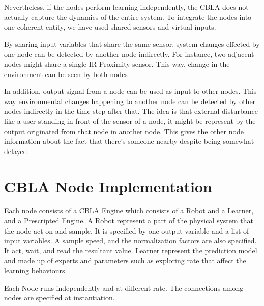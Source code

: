 Nevertheless, if the nodes perform learning independently, the CBLA does not actually capture the dynamics of the entire system. To integrate the nodes into one coherent entity, we have used shared sensors and virtual inputs.

By sharing input variables that share the same sensor, system changes effected by one node can be detected by another node indirectly. For instance, two adjacent nodes might share a single IR Proximity sensor. This way, change in the environment can be seen by both nodes

In addition, output signal from a node can be used as input to other nodes. This way environmental changes happening to another node can be detected by other nodes indirectly in the time step after that. The idea is that external disturbance like a user standing in front of the sensor of a node, it might be represent by the output originated from  that node in another node. This gives the other node information about the fact that there's someone nearby despite being somewhat delayed. 

\section{CBLA Node Implementation}

Each node consists of a CBLA Engine which consists of a Robot and a Learner, and a Prescripted Engine. 
A Robot represent a part of the physical system that the node act on and sample. It is specified by one output variable and a list of input variables. A sample speed, and the normalization factors are also specified. It  act, wait, and read the resultant value. Learner represent the prediction model and made up of experts and parameters such as exploring rate that affect the learning behaviours. 

Each Node runs independently and at different rate. The connections among nodes are specified at instantiation.  

